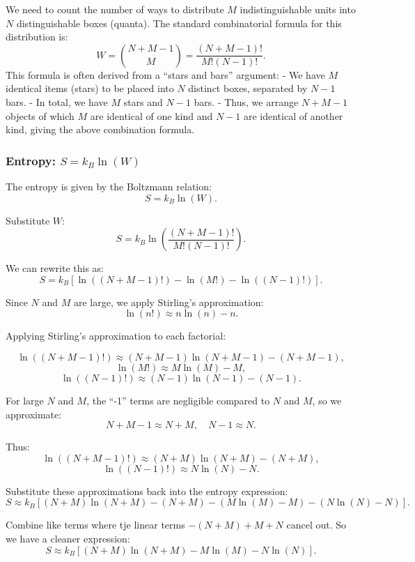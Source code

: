 \documentclass{report}
\begin{document}
We need to count the number of ways to distribute $M$ indistinguishable units into $N$ distinguishable boxes (quanta). The standard combinatorial formula for this distribution is:
\[
W = \binom{N + M - 1}{M} = \frac{(N + M - 1)!}{M! (N-1)!}.
\]
\newline
This formula is often derived from a “stars and bars” argument:\newline
- We have $M$ identical items (stars) to be placed into $N$ distinct boxes, separated by $N-1$ bars. \newline
- In total, we have $M$ stars and $N-1$ bars. \newline
- Thus, we arrange $N + M - 1$ objects of which $M$ are identical of one kind and $N-1$ are identical of another kind, giving the above combination formula.\newline

\subsubsection*{Entropy: $S = k_B \ln(W)$}

The entropy is given by the Boltzmann relation:
\[
S = k_B \ln(W).
\]

Substitute $W$:
\[
S = k_B \ln\left(\frac{(N + M - 1)!}{M! (N - 1)!}\right).
\]

We can rewrite this as:
\[
S = k_B \left[ \ln((N + M - 1)!) - \ln(M!) - \ln((N-1)!) \right].
\]

Since $N$ and $M$ are large, we apply Stirling’s approximation:
\[
\ln(n!) \approx n \ln(n) - n.
\]

Applying Stirling’s approximation to each factorial:

\[
\ln((N+M-1)!) \approx (N + M - 1)\ln(N+M-1) - (N + M - 1),
\]
\[
\ln(M!) \approx M \ln(M) - M,
\]
\[
\ln((N-1)!) \approx (N-1)\ln(N-1) - (N-1).
\]

For large $N$ and $M$, the “-1” terms are negligible compared to $N$ and $M$, so we approximate:
\[
N + M - 1 \approx N + M, \quad N - 1 \approx N.
\]

Thus:
\[
\ln((N + M - 1)!) \approx (N + M) \ln(N + M) - (N + M),
\]
\[
\ln((N-1)!) \approx N \ln(N) - N.
\]

Substitute these approximations back into the entropy expression:
\[
S \approx k_B \left[ (N + M)\ln(N + M) - (N + M) - (M \ln(M) - M) - (N \ln(N) - N) \right].
\]

Combine like terms where tje linear terms $-(N+M) + M + N$ cancel out. So we have a cleaner expression:
\[
S \approx k_B \left[ (N + M)\ln(N + M) - M \ln(M) - N \ln(N) \right].
\]
\end{document}
